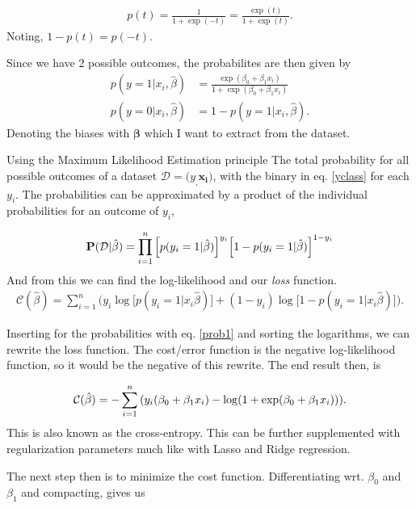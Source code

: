 \documentclass[10pt]{article}
\begin{document}
\begin{align}
	p(t) = \frac{1}{1 + \exp(-t)} = \frac{\exp(t)}{1+\exp(t)}
	\label{logit}.
\end{align}
Noting, $1 - p(t) = p(-t)$.

Since we have 2 possible outcomes, the probabilites are then given by
\begin{align}
	p(y=1|x_i, \hat{\beta}) &= \frac{ \exp(\beta_0 + \beta_1x_i) }
								{ 1 + \exp(\beta_0 + \beta_1x_i) } 
								\label{prob1}\\
	p(y=0|x_i, \hat{\beta}) &= 1 - p(y=1|x_i, \hat{\beta})\label{prob0}.
\end{align}
Denoting the biases with $\mathbf{\beta}$ which I want to extract from the dataset. 

Using the Maximum Likelihood Estimation %
principle The total probability for all possible outcomes of a dataset
$\mathcal{D} = {(y_, \mathbf{x_i)}}$, with the binary in eq. \ref{yclass} for
each $y_i$. The probabilities can be approximated by a product of the
individual probabilities for an outcome of $y_i$,

\begin{align}
	\mathbf{P}(\mathcal{D}|\hat{\beta}) 
		= \prod_{i=1}^n\qty[p(y_i=1|\hat{\beta})]^{y_i}
			\qty[ 1 - p(y_i=1|\hat{\beta}) ]^{1-y_i}
\end{align}
And from this we can find the log-likelihood and our \emph{loss} function. 
\begin{align}
	\mathcal{C}(\hat{\beta}) = 
		\sum_{i=1}^n \bigg( 
			y_i \log\big[p(y_i=1|x_i\hat{\beta})\big] + 
			(1 - y_i)\log\big[ 1 - p(y_i=1|x_i\hat{\beta})\big]\bigg).
\end{align}

Inserting for the probabilities with eq. \ref{prob1} and sorting the logarithms, we can
rewrite the loss function. The cost/error function is the negative log-likelihood function, so it
would be the negative of this rewrite. The end result then, is

\begin{align}
	\mathcal{C}(\hat{\beta}) = 
		-\sum_{i=1}^n \qty(y_i(\beta_0 + \beta_1x_i) - \log(1 + \exp(\beta_0 + \beta_1x_i)))
		\label{costfunc}.
\end{align}
This is also known as the cross-entropy. This can be further supplemented with regularization
parameters much like with Lasso and Ridge regression. 

The next step then is to minimize the cost function. Differentiating wrt. $\beta_0$ and $\beta_1$
and compacting, gives us
\end{document}
